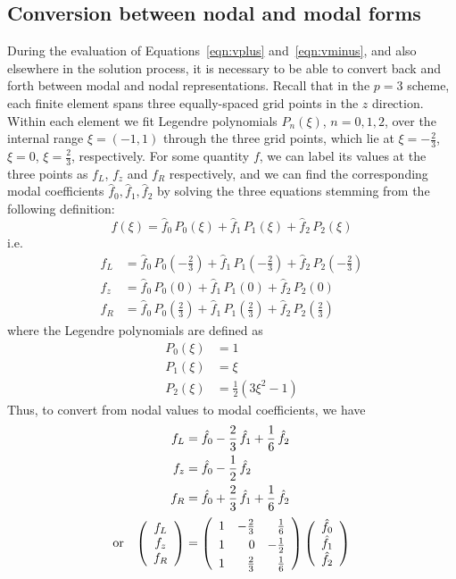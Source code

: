 \documentclass[10pt,a4paper]{article}
\begin{document}
\subsection{Conversion between nodal and modal forms}

During the evaluation of Equations~\ref{eqn:vplus} and~\ref{eqn:vminus}, and
also elsewhere in the solution process, it is necessary to be able to convert
back and forth between modal and nodal representations. Recall that in the
$p=3$ scheme, each finite element spans three equally-spaced grid points in
the $z$ direction. Within each element we fit Legendre polynomials $P_n(\xi)$,
$n=0,1,2$, over the internal range $\xi=(-1,1)$ through the three grid points,
which lie at $\xi=-\frac{2}{3}$, $\xi=0$, $\xi=\frac{2}{3}$, respectively. For
some quantity $f$, we can label its values at the three points as $f_L$, $f_z$
and $f_R$ respectively, and we can find the corresponding modal coefficients
$\hat{f}_0,\hat{f}_1,\hat{f}_2$ by solving the three equations stemming from
the following definition:
\[
f(\xi) = \hat{f}_0\,P_0(\xi) + \hat{f}_1\,P_1(\xi) + \hat{f}_2\,P_2(\xi)
\]
i.e.
\begin{align*}
f_L & = \hat{f}_0\,P_0\left(-\frac{2}{3}\right) +
\hat{f}_1\,P_1\left(-\frac{2}{3}\right) + \hat{f}_2\,P_2\left(-\frac{2}{3}\right) \\ 
f_z & = \hat{f}_0\,P_0\left(0\right) + \hat{f}_1\,P_1\left(0\right) +
\hat{f}_2\,P_2\left(0\right) \\
f_R & = \hat{f}_0\,P_0\left(\frac{2}{3}\right) + \hat{f}_1\,P_1\left(\frac{2}{3}\right) +
\hat{f}_2\,P_2\left(\frac{2}{3}\right)
\end{align*}
where the Legendre polynomials are defined as
\begin{align*}
P_0(\xi) & = 1 \\
P_1(\xi) & = \xi \\
P_2(\xi) & = \frac{1}{2} (3 \xi^2 - 1)
\end{align*}
Thus, to convert from nodal values to modal coefficients, we have
\begin{align*}
f_L & = \hat{f}_0 - \frac{2}{3}\,\hat{f}_1 + \frac{1}{6}\,\hat{f}_2 \\
f_z & = \hat{f}_0 - \frac{1}{2}\,\hat{f}_2 \\
f_R & = \hat{f}_0 + \frac{2}{3}\,\hat{f}_1 + \frac{1}{6}\,\hat{f}_2 \\
\mbox{or} \;\;\; \left( \begin{array}{c}
f_L \\ f_z \\ f_R
\end{array} \right)
& = \left( \begin{array}{rrr}
\rule{0pt}{4mm} 1 & -\frac{2}{3} & \frac{1}{6} \\
\rule{0pt}{4mm} 1 & 0 & -\frac{1}{2} \\
\rule{0pt}{4mm} 1 & \frac{2}{3} & \frac{1}{6}
\end{array} \right)
\left( \begin{array}{c}
\hat{f}_0 \\ \hat{f}_1 \\ \hat{f}_2
\end{array} \right)
\end{align*}
\end{document}
